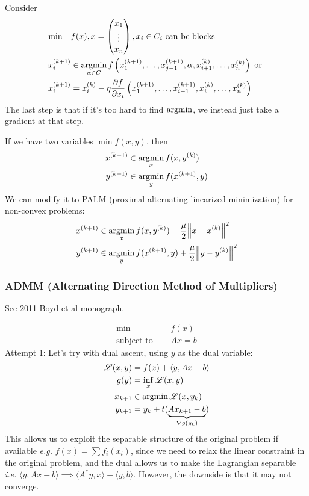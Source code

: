 \documentclass[class=article,crop=false]{standalone}
\begin{document}
Consider
\begin{align*}
	\min \quad & f(x), x = \begin{pmatrix} x_1 \\ \vdots\\x_n \end{pmatrix}, x_i  \in C_i \text{ can be blocks} \\
	x_i^{(k+1)} &\in \operatorname*{argmin}_{\alpha \in C} f\left( x_1^{(k+1)}, \ldots, x_{j-1}^{(k+1)}, \alpha, x_{i+1}^{(k)},\ldots, x_n^{(k)} \right) \text{ or } \\
	x_i^{(k+1)} &= x_i^{(k)} -\eta \frac{\partial f}{\partial x_i} \left( x_1^{(k+1)},\ldots,x_{i-1}^{(k+1)}, x_i^{(k)},\ldots, x_n^{(k)} \right)  
\end{align*}
The last step is that if it's too hard to find $ \operatorname*{argmin}$, we instead just take a gradient at that step.

If we have two variables $ \min f(x,y)$, then
\begin{align*}
	x^{(k+1)} &\in \operatorname*{argmin}_{x} f(x,y^{(k)})\\
	y^{(k+1)} & \in \operatorname*{argmin}_{y} f(x^{(k+1)},y)
\end{align*}
We can modify it to PALM (proximal alternating linearized minimization) for non-convex problems:
\begin{align*}
	x^{(k+1)} &\in \operatorname*{argmin}_{x} f(x,y^{(k)}) + \frac{\mu}{2} {\left\lVert{ x - x^{(k)}}\right\rVert}^2 \\
	y^{(k+1)} & \in \operatorname*{argmin}_{y} f(x^{(k+1)},y) + \frac{\mu}{2} {\left\lVert{ y-y^{(k)}}\right\rVert}^2 
\end{align*}

\subsubsection{ADMM (Alternating Direction Method of Multipliers)}
See 2011 Boyd et al monograph.

\begin{align*}
\min\quad &f(x) \\
\text{subject to } \quad & Ax=b 
\end{align*}
Attempt 1: Let's try with dual ascent, using $ y$ as the dual variable:
\begin{align*}
	\mathscr{L}(x,y) &= f(x) + \langle y,Ax-b \rangle\\
	g(y) &= \inf_{x} \mathscr{L}(x,y) \\
	x_{k+1} &\in \operatorname*{argmin} \mathscr{L}(x,y_k)\\ 
	y_{k+1} &= y_k + t (\underbrace{ Ax_{k+1}-b}_{\nabla g(y_k) } ) 
\end{align*}
This allows us to exploit the separable structure of the original problem if available \emph{e.g.} $ f(x) = \sum f_i(x_i)$, since we need to relax the linear constraint in the original problem, and the dual allows us to make the Lagrangian separable \emph{i.e.} $ \langle y,Ax-b \rangle \implies \langle A^* y,x \rangle - \langle y,b \rangle$. However, the downside is that it may not converge.
\end{document}
